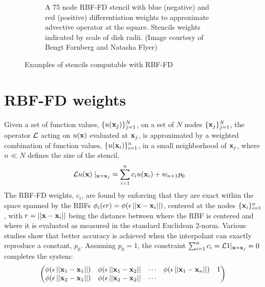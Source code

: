 \documentclass{report}
\begin{document}
{\begin{figure}[htbp]
\begin{subfigure}[m]{0.35\textwidth}
		\caption{A 75 node RBF-FD stencil with blue (negative) and red (positive) differentiation weights to approximate advective operator at the square. Stencils weights indicated by scale of disk radii. (Image courtesy of Bengt Fornberg and Natasha Flyer)}
		\label{fig:stencil_example_sphere}
	\end{subfigure}
	\caption{Examples of stencils computable with RBF-FD }
	\label{fig:stencil_example}
\end{figure}


\section{RBF-FD weights}
\label{sec:rbffd}

Given a set of function values, $\{u(\mathbf{x}_j)\}_{j=1}^{N}$, on a set of $N$ nodes $\{\mathbf{x}_j\}_{j=1}^{N}$, the operator $\diffop$ acting on $u(\mathbf{x})$ evaluated at 
$\mathbf{x}_j$, %
is approximated by a weighted combination of function values, $\{u(\mathbf{x}_i)\}_{i=1}^{n}$, in a small neighborhood of $\mathbf{x}_j$, 
where $n\ll N$ defines the size of the stencil. 
\begin{align}
\mathcal{L}u(\mathbf{x})\mid_{\mathbf{x}=\mathbf{x}_j} &\approx \sum_{i=1}^{n} c_i u(\mathbf{x}_i) + w_{n+1} p_0
\label{eq:derivFromFDWeights}
\end{align}
The RBF-FD weights, ${c_i}$, are found by enforcing that they are exact within the space spanned by the RBFs $\phi_i(\epsilon r) = \phi(\epsilon\left|\left|\mathbf{x}-\mathbf{x}_{i}\right|\right|)$, centered at the nodes $\{\mathbf{x}_i\}_{i=1}^{n}$, with 
$r=\left|\left|\mathbf{x} - \mathbf{x}_i\right|\right|$
being the distance between where the RBF is centered and where it is evaluated as measured in the standard Euclidean 2-norm. Various studies show  \cite{WrightFornberg06,FornbergDriscoll02,FornbergLehto11,FlyerLehto11} that better accuracy is achieved when the 
interpolant can exactly reproduce a constant, $p_0$.  
Assuming $p_0 = 1$, the constraint $\sum_{i=1}^{n}c_i=\mathcal{L}1|_{\mathbf{x}=\mathbf{x}_{j}}=0$ completes the system: 
\begin{align}
\begin{pmatrix}
\phi(\epsilon\left|\left|\mathbf{x}_1-\mathbf{x}_1\right|\right|) & \phi(\epsilon\left|\left|\mathbf{x}_1-\mathbf{x}_2\right|\right| & \cdots & \phi(\epsilon\left|\left|\mathbf{x}_1-\mathbf{x}_n\right|\right|) & 1 \\
\phi(\epsilon\left|\left|\mathbf{x}_2-\mathbf{x}_1\right|\right|) & \phi(\epsilon\left|\left|\mathbf{x}_2-\mathbf{x}_2\right|\right| & \cdots &

\end{pmatrix}
\end{align}}
\end{document}
